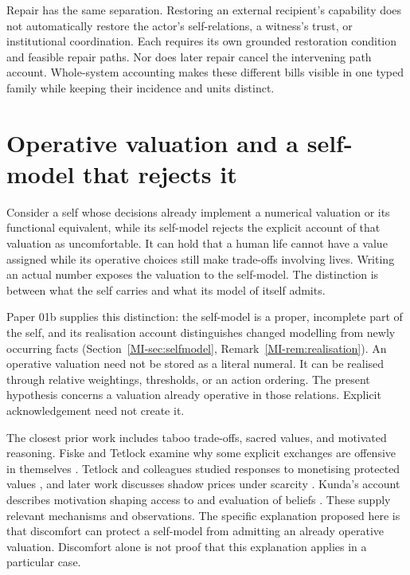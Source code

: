 \documentclass[11pt,a4paper]{article}
\theoremstyle{remark}
\begin{document}
Repair has the same separation. Restoring an external recipient's capability
does not automatically restore the actor's self-relations, a witness's trust,
or institutional coordination. Each requires its own grounded restoration
condition and feasible repair paths. Nor does later repair cancel the intervening
path account. Whole-system accounting makes these different bills visible in
one typed family while keeping their incidence and units distinct.

\section{Operative valuation and a self-model that rejects it}\label{sec:numeric}

Consider a self whose decisions already implement a numerical valuation or its
functional equivalent, while its self-model rejects the explicit account of that
valuation as uncomfortable. It can hold that a human life cannot have a value
assigned while its operative choices still make trade-offs involving lives.
Writing an actual number exposes the valuation to the self-model. The distinction
is between what the self carries and what its model of itself admits.

Paper 01b supplies this distinction: the self-model is a proper, incomplete
part of the self, and its realisation account distinguishes changed modelling
from newly occurring facts (Section~\ref{MI-sec:selfmodel},
Remark~\ref{MI-rem:realisation}). An operative valuation need not be stored as
a literal numeral. It can be realised through relative weightings, thresholds,
or an action ordering. The present hypothesis concerns a valuation already
operative in those relations. Explicit acknowledgement need not create it.

The closest prior work includes taboo trade-offs, sacred values, and motivated
reasoning. Fiske and Tetlock examine why some explicit exchanges are offensive
in themselves \citep{fisketetlock1997taboo}. Tetlock and colleagues studied
responses to monetising protected values \citep{tetlock2000unthinkable}, and later
work discusses shadow prices under scarcity \citep{tetlock2017sacred}. Kunda's
account describes motivation shaping access to and evaluation of beliefs
\citep{kunda1990motivated}. These supply relevant mechanisms and observations.
The specific explanation proposed here is that discomfort can protect a
self-model from admitting an already operative valuation. Discomfort alone is
not proof that this explanation applies in a particular case.
\end{document}
